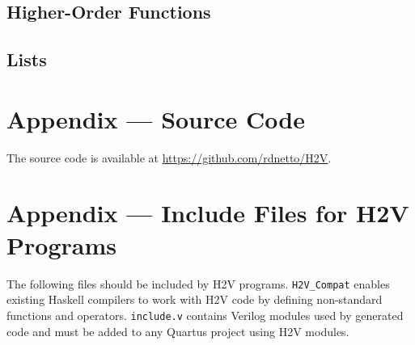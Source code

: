\documentclass[english,onecolumn]{scrartcl}
\begin{document}
\subsection{Higher-Order Functions}
\label{sec:testHOFunc}

\subsection{Lists}
\label{sec:testList}

\section{Appendix --- Source Code}
The source code is available at \url{https://github.com/rdnetto/H2V}.

\section{Appendix --- Include Files for H2V Programs}
The following files should be included by H2V programs. \texttt{H2V\_Compat} enables existing Haskell compilers to work with H2V
code by defining non-standard functions and operators. \texttt{include.v} contains Verilog modules used by generated code and must
be added to any Quartus project using H2V modules.




\printbibliography
\end{document}
